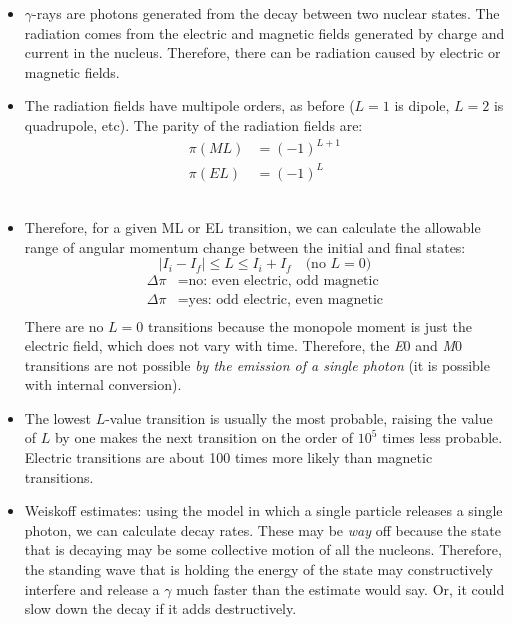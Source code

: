 \documentclass[letter]{article}
\begin{document}
\begin{itemize}
\item $\gamma$-rays are photons generated from the decay between two
  nuclear states. The radiation comes from the electric and magnetic
  fields generated by charge and current in the nucleus. Therefore,
  there can be radiation caused by electric or magnetic
  fields.~\cite[pp.330]{krane}
\item The radiation fields have multipole orders, as before ($L=1$ is
  dipole, $L=2$ is quadrupole, etc). The parity of the radiation
  fields are:
  \begin{equation*}
    \begin{split}
      \pi(ML)&=(-1)^{L+1} \\
      \pi(EL)&=(-1)^{L}
    \end{split}
  \end{equation*}
~\cite[pp.330]{krane}
\item Therefore, for a given ML or EL transition, we can calculate the
  allowable range of angular momentum change between the initial and
  final states:
  \begin{equation*}
    |I_i-I_f| \leq L \leq I_i+I_f \quad \text{(no }L=0\text{)}
  \end{equation*}
  \begin{equation*}
    \begin{split}
      \Delta\pi &= \text{no: even electric, odd magnetic} \\
      \Delta\pi &= \text{yes: odd electric, even magnetic} \\
    \end{split}
  \end{equation*}
There are no $L=0$ transitions because the monopole moment is just
the electric field, which does not vary with time. Therefore, the \textit{E}0
and \textit{M}0 transitions are not possible \textit{by the emission
  of a single photon} (it is possible with internal conversion).~\cite[pp. 334]{krane}
\item The lowest $L$-value transition is usually the most probable,
  raising the value of $L$ by one makes the next transition on the order of
  $10^5$ times less probable. Electric transitions are about 100 times
  more likely than magnetic transitions.~\cite[pp. 335]{krane}
\item Weiskoff estimates: using the model in which a single particle
  releases a single photon, we can calculate decay rates. These may be
  \textit{way} off because the state that is decaying may be some
  collective motion of all the nucleons. Therefore, the standing wave
  that is holding the energy of the state may constructively interfere
  and release a $\gamma$ much faster than the estimate would say. Or,
  it could slow down the decay if it adds destructively.~\cite[Lec. 22]{lecture}
\end{itemize}
\end{document}
